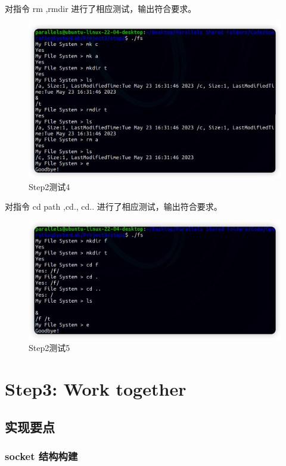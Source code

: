 \documentclass{article}
\begin{document}
对指令 rm ,rmdir 进行了相应测试，输出符合要求。

\begin{figure}[H]
\center
\includegraphics[scale = 0.35]{s2-t4.png}
\caption{Step2测试4}
\label{s2-t4}
\end{figure}

对指令 cd path ,cd., cd.. 进行了相应测试，输出符合要求。

\begin{figure}[H]
\center
\includegraphics[scale = 0.35]{s2-t5.png}
\caption{Step2测试5}
\label{s2-t5}
\end{figure}

\section{Step3: Work together}

\subsection{实现要点}

\subsubsection{socket 结构构建}
\end{document}
